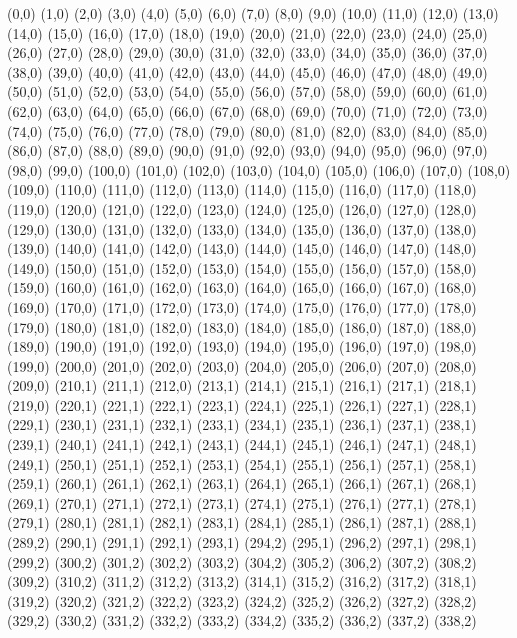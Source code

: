 (0,0)
(1,0)
(2,0)
(3,0)
(4,0)
(5,0)
(6,0)
(7,0)
(8,0)
(9,0)
(10,0)
(11,0)
(12,0)
(13,0)
(14,0)
(15,0)
(16,0)
(17,0)
(18,0)
(19,0)
(20,0)
(21,0)
(22,0)
(23,0)
(24,0)
(25,0)
(26,0)
(27,0)
(28,0)
(29,0)
(30,0)
(31,0)
(32,0)
(33,0)
(34,0)
(35,0)
(36,0)
(37,0)
(38,0)
(39,0)
(40,0)
(41,0)
(42,0)
(43,0)
(44,0)
(45,0)
(46,0)
(47,0)
(48,0)
(49,0)
(50,0)
(51,0)
(52,0)
(53,0)
(54,0)
(55,0)
(56,0)
(57,0)
(58,0)
(59,0)
(60,0)
(61,0)
(62,0)
(63,0)
(64,0)
(65,0)
(66,0)
(67,0)
(68,0)
(69,0)
(70,0)
(71,0)
(72,0)
(73,0)
(74,0)
(75,0)
(76,0)
(77,0)
(78,0)
(79,0)
(80,0)
(81,0)
(82,0)
(83,0)
(84,0)
(85,0)
(86,0)
(87,0)
(88,0)
(89,0)
(90,0)
(91,0)
(92,0)
(93,0)
(94,0)
(95,0)
(96,0)
(97,0)
(98,0)
(99,0)
(100,0)
(101,0)
(102,0)
(103,0)
(104,0)
(105,0)
(106,0)
(107,0)
(108,0)
(109,0)
(110,0)
(111,0)
(112,0)
(113,0)
(114,0)
(115,0)
(116,0)
(117,0)
(118,0)
(119,0)
(120,0)
(121,0)
(122,0)
(123,0)
(124,0)
(125,0)
(126,0)
(127,0)
(128,0)
(129,0)
(130,0)
(131,0)
(132,0)
(133,0)
(134,0)
(135,0)
(136,0)
(137,0)
(138,0)
(139,0)
(140,0)
(141,0)
(142,0)
(143,0)
(144,0)
(145,0)
(146,0)
(147,0)
(148,0)
(149,0)
(150,0)
(151,0)
(152,0)
(153,0)
(154,0)
(155,0)
(156,0)
(157,0)
(158,0)
(159,0)
(160,0)
(161,0)
(162,0)
(163,0)
(164,0)
(165,0)
(166,0)
(167,0)
(168,0)
(169,0)
(170,0)
(171,0)
(172,0)
(173,0)
(174,0)
(175,0)
(176,0)
(177,0)
(178,0)
(179,0)
(180,0)
(181,0)
(182,0)
(183,0)
(184,0)
(185,0)
(186,0)
(187,0)
(188,0)
(189,0)
(190,0)
(191,0)
(192,0)
(193,0)
(194,0)
(195,0)
(196,0)
(197,0)
(198,0)
(199,0)
(200,0)
(201,0)
(202,0)
(203,0)
(204,0)
(205,0)
(206,0)
(207,0)
(208,0)
(209,0)
(210,1)
(211,1)
(212,0)
(213,1)
(214,1)
(215,1)
(216,1)
(217,1)
(218,1)
(219,0)
(220,1)
(221,1)
(222,1)
(223,1)
(224,1)
(225,1)
(226,1)
(227,1)
(228,1)
(229,1)
(230,1)
(231,1)
(232,1)
(233,1)
(234,1)
(235,1)
(236,1)
(237,1)
(238,1)
(239,1)
(240,1)
(241,1)
(242,1)
(243,1)
(244,1)
(245,1)
(246,1)
(247,1)
(248,1)
(249,1)
(250,1)
(251,1)
(252,1)
(253,1)
(254,1)
(255,1)
(256,1)
(257,1)
(258,1)
(259,1)
(260,1)
(261,1)
(262,1)
(263,1)
(264,1)
(265,1)
(266,1)
(267,1)
(268,1)
(269,1)
(270,1)
(271,1)
(272,1)
(273,1)
(274,1)
(275,1)
(276,1)
(277,1)
(278,1)
(279,1)
(280,1)
(281,1)
(282,1)
(283,1)
(284,1)
(285,1)
(286,1)
(287,1)
(288,1)
(289,2)
(290,1)
(291,1)
(292,1)
(293,1)
(294,2)
(295,1)
(296,2)
(297,1)
(298,1)
(299,2)
(300,2)
(301,2)
(302,2)
(303,2)
(304,2)
(305,2)
(306,2)
(307,2)
(308,2)
(309,2)
(310,2)
(311,2)
(312,2)
(313,2)
(314,1)
(315,2)
(316,2)
(317,2)
(318,1)
(319,2)
(320,2)
(321,2)
(322,2)
(323,2)
(324,2)
(325,2)
(326,2)
(327,2)
(328,2)
(329,2)
(330,2)
(331,2)
(332,2)
(333,2)
(334,2)
(335,2)
(336,2)
(337,2)
(338,2)
